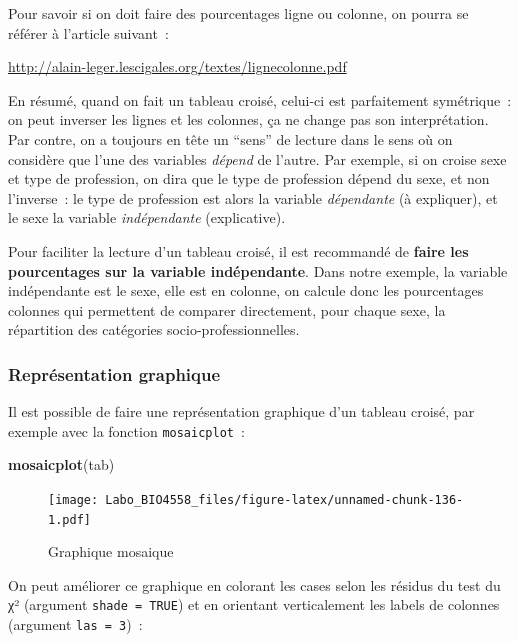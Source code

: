\documentclass[12pt,]{book}
\makeatletter
\newenvironment{Shaded}{\begin{snugshade}}{\end{snugshade}}
\newcommand{\KeywordTok}[1]{\textcolor[rgb]{0.13,0.29,0.53}{\textbf{#1}}}
\newcommand{\NormalTok}[1]{#1}
\newenvironment{kframe}{%
\medskip{}
\setlength{\fboxsep}{.8em}
\def\at@end@of@kframe{}%
\ifinner\ifhmode%
 \def\at@end@of@kframe{\end{minipage}}%
 \begin{minipage}{\columnwidth}%
\fi\fi%
\def\FrameCommand##1{\hskip\@totalleftmargin \hskip-\fboxsep
\colorbox{incolor}{##1}\hskip-\fboxsep
    \hskip-\linewidth \hskip-\@totalleftmargin \hskip\columnwidth}%
\MakeFramed {\advance\hsize-\width
  \@totalleftmargin\z@ \linewidth\hsize
  \@setminipage}}%
{\par\unskip\endMakeFramed%
\at@end@of@kframe}
\newenvironment{rmdblock}[1]
 {
 \begin{itemize}
 \renewcommand{\labelitemi}{
   \raisebox{-.7\height}[0pt][0pt]{
     {\setkeys{Gin}{width=3em,keepaspectratio}\texttt{[image: images/\#1]}}
   }
 }
 \begin{kframe}
 \setlength{\fboxsep}{1em}
 \item
 }
 {
 \end{kframe}
 \end{itemize}
 }
\newenvironment{rmdnote}
  {\begin{rmdblock}{note}}
  {\end{rmdblock}}
\makeatother
\begin{document}
\begin{rmdnote}
Pour savoir si on doit faire des pourcentages ligne ou colonne, on
pourra se référer à l'article suivant~:

\url{http://alain-leger.lescigales.org/textes/lignecolonne.pdf}

En résumé, quand on fait un tableau croisé, celui-ci est parfaitement
symétrique~: on peut inverser les lignes et les colonnes, ça ne change
pas son interprétation. Par contre, on a toujours en tête un ``sens'' de
lecture dans le sens où on considère que l'une des variables
\emph{dépend} de l'autre. Par exemple, si on croise sexe et type de
profession, on dira que le type de profession dépend du sexe, et non
l'inverse~: le type de profession est alors la variable
\emph{dépendante} (à expliquer), et le sexe la variable
\emph{indépendante} (explicative).

Pour faciliter la lecture d'un tableau croisé, il est recommandé de
\textbf{faire les pourcentages sur la variable indépendante}. Dans notre
exemple, la variable indépendante est le sexe, elle est en colonne, on
calcule donc les pourcentages colonnes qui permettent de comparer
directement, pour chaque sexe, la répartition des catégories
socio-professionnelles.
\end{rmdnote}

\hypertarget{repruxe9sentation-graphique-1}{%
\subsubsection{Représentation graphique}\label{repruxe9sentation-graphique-1}}

Il est possible de faire une représentation graphique d'un tableau croisé, par exemple avec la fonction \texttt{mosaicplot}~:

\begin{Shaded}
\begin{Highlighting}[]
\KeywordTok{mosaicplot}\NormalTok{(tab)}
\end{Highlighting}
\end{Shaded}

\begin{figure}
\centering
\texttt{[image: Labo\_BIO4558\_files/figure-latex/unnamed-chunk-136-1.pdf]}
\caption{\label{fig:unnamed-chunk-136}Graphique mosaique}
\end{figure}

On peut améliorer ce graphique en colorant les cases selon les résidus du test du χ² (argument \texttt{shade\ =\ TRUE}) et en orientant verticalement les labels de colonnes (argument \texttt{las\ =\ 3})~:
\end{document}
